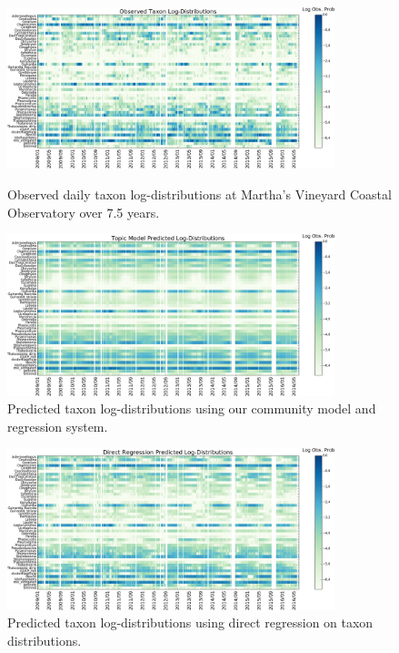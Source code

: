 \begin{figure}
    \centering
    \begin{subfloat}
        \centering
        \includegraphics[width=0.85\textwidth]{figures/oceans/taxa_distros_gt.png}
        \caption{Observed daily taxon log-distributions at Martha's Vineyard Coastal Observatory over 7.5 years.}
        \label{fig:plankton-mvco-gt}
    \end{subfloat}
    \begin{subfloat}
        \centering
        \includegraphics[width=0.85\textwidth]{figures/oceans/taxa_distros_hat_topics.png}
        \caption{Predicted taxon log-distributions using our community model and regression system.}
        \label{fig:plankton-mvco-topic-est}
    \end{subfloat}%
\end{figure}
\begin{figure}
	\ContinuedFloat
    \centering
    \begin{subfloat}
        \centering
        \includegraphics[width=0.85\textwidth]{figures/oceans/taxa_distros_hat_words.png}
        \caption{Predicted taxon log-distributions using direct regression on taxon distributions.}
        \label{fig:plankton-mvco-word-est}
    \end{subfloat}
    \label{fig:plankton-mvco}
\end{figure}

